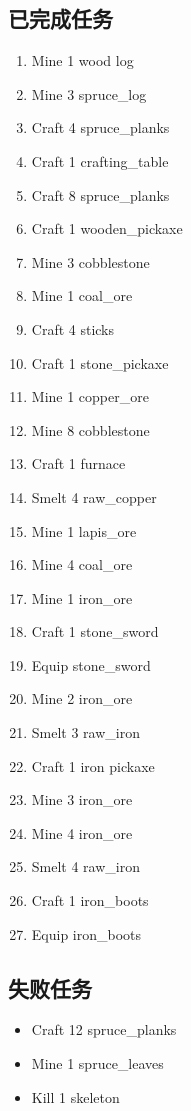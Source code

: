 \documentclass[11pt,a4paper]{ctexart}
\begin{document}
\subsection{已完成任务}

\begin{enumerate}
  \item Mine 1 wood log
  \item Mine 3 spruce\_log
  \item Craft 4 spruce\_planks
  \item Craft 1 crafting\_table
  \item Craft 8 spruce\_planks
  \item Craft 1 wooden\_pickaxe
  \item Mine 3 cobblestone
  \item Mine 1 coal\_ore
  \item Craft 4 sticks
  \item Craft 1 stone\_pickaxe
  \item Mine 1 copper\_ore
  \item Mine 8 cobblestone
  \item Craft 1 furnace
  \item Smelt 4 raw\_copper
  \item Mine 1 lapis\_ore
  \item Mine 4 coal\_ore
  \item Mine 1 iron\_ore
  \item Craft 1 stone\_sword
  \item Equip stone\_sword
  \item Mine 2 iron\_ore
  \item Smelt 3 raw\_iron
  \item Craft 1 iron pickaxe
  \item Mine 3 iron\_ore
  \item Mine 4 iron\_ore
  \item Smelt 4 raw\_iron
  \item Craft 1 iron\_boots
  \item Equip iron\_boots
\end{enumerate}

\subsection{失败任务}

\begin{itemize}
  \item Craft 12 spruce\_planks
  \item Mine 1 spruce\_leaves
  \item Kill 1 skeleton
\end{itemize}
\end{document}

